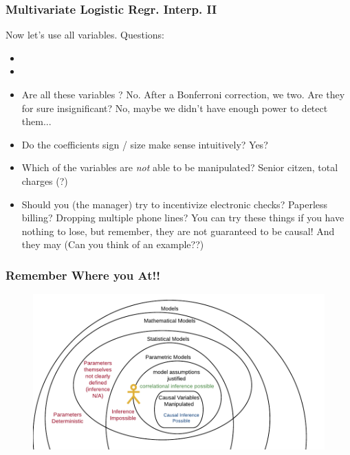 \documentclass[handout]{beamer}
\begin{document}
\begin{frame}\frametitle{Multivariate Logistic Regr. Interp. II}

\small
Now let's use all variables. Questions:

\begin{itemize}
\item {}
\item {}
\item Are all these variables ? \pause No. After a Bonferroni correction, we  two. Are they for sure insignificant? \pause No, maybe we didn't have enough power to detect them...
\item Do the coefficients sign / size make sense intuitively? \pause Yes?
\item Which of the  variables are \textit{not} able to be manipulated? \pause Senior citzen, total charges (?) \pause
\item Should you (the manager) try to incentivize electronic checks? \pause Paperless billing? \pause Dropping multiple phone lines? \pause You can try these things if you have nothing to lose, but remember, they are not guaranteed to be causal! And they may  (Can you think of an example??)
\end{itemize}

\end{frame}

\begin{frame}\frametitle{Remember Where you At!!}

\begin{figure}
\centering
\includegraphics[width=4.75in]{where_we_at}
\end{figure}

	
\end{frame}
\end{document}

